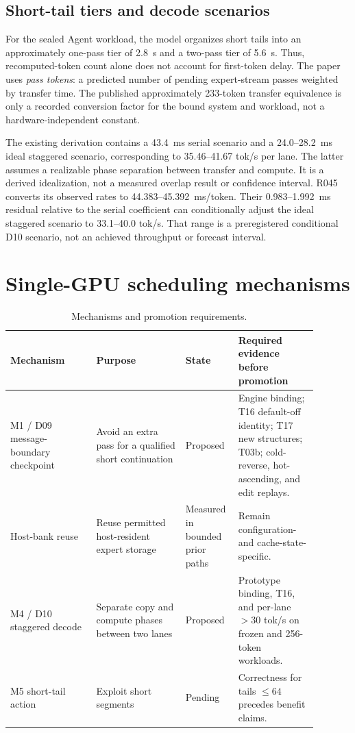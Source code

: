 \documentclass[11pt]{article}
\begin{document}
\subsection{Short-tail tiers and decode scenarios}

For the sealed Agent workload, the model organizes short tails into an approximately one-pass tier of 2.8~s and a two-pass tier of 5.6~s. Thus, recomputed-token count alone does not account for first-token delay. The paper uses \textit{pass tokens}: a predicted number of pending expert-stream passes weighted by transfer time. The published approximately 233-token transfer equivalence is only a recorded conversion factor for the bound system and workload, not a hardware-independent constant.

The existing derivation contains a 43.4~ms serial scenario and a 24.0--28.2~ms ideal staggered scenario, corresponding to 35.46--41.67 tok/s per lane. The latter assumes a realizable phase separation between transfer and compute. It is a derived idealization, not a measured overlap result or confidence interval. R045 converts its observed rates to 44.383--45.392~ms/token. Their 0.983--1.992~ms residual relative to the serial coefficient can conditionally adjust the ideal staggered scenario to 33.1--40.0 tok/s. That range is a preregistered conditional D10 scenario, not an achieved throughput or forecast interval.

\section{Single-GPU scheduling mechanisms}

\begin{table}[t]
\centering
\small
\begin{tabular}{p{0.26\linewidth}p{0.27\linewidth}p{0.12\linewidth}p{0.24\linewidth}}
\toprule
Mechanism & Purpose & State & Required evidence before promotion \\
\midrule
M1 / D09 message-boundary checkpoint & Avoid an extra pass for a qualified short continuation & Proposed & Engine binding; T16 default-off identity; T17 new structures; T03b; cold-reverse, hot-ascending, and edit replays. \\
Host-bank reuse & Reuse permitted host-resident expert storage & Measured in bounded prior paths & Remain configuration- and cache-state-specific. \\
M4 / D10 staggered decode & Separate copy and compute phases between two lanes & Proposed & Prototype binding, T16, and per-lane $>30$ tok/s on frozen and 256-token workloads. \\
M5 short-tail action & Exploit short segments & Pending & Correctness for tails $\leq64$ precedes benefit claims. \\
\bottomrule
\end{tabular}
\caption{Mechanisms and promotion requirements.}
\label{tab:mechanisms}
\end{table}
\end{document}
